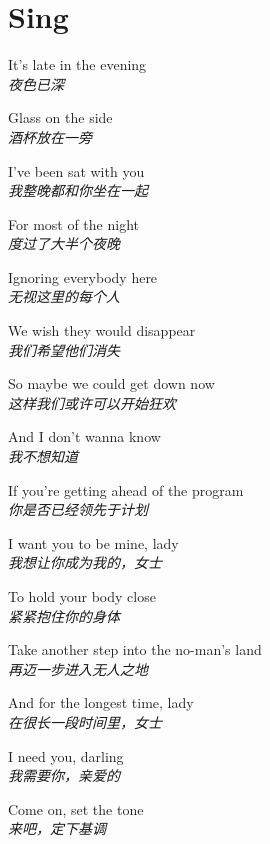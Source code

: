 \section{Sing}

\thispagestyle{empty}


\begin{spacing}{1.5}
\begin{flushleft}
It's late in the evening\\
\textit{夜色已深}\lyricspace

Glass on the side\\
\textit{酒杯放在一旁}\lyricspace

I've been sat with you\\
\textit{我整晚都和你坐在一起}\lyricspace

For most of the night\\
\textit{度过了大半个夜晚}\lyricspace

Ignoring everybody here\\
\textit{无视这里的每个人}\lyricspace

We wish they would disappear\\
\textit{我们希望他们消失}\lyricspace

So maybe we could get down now\\
\textit{这样我们或许可以开始狂欢}\lyricspace

And I don't wanna know\\
\textit{我不想知道}\lyricspace

If you're getting ahead of the program\\
\textit{你是否已经领先于计划}\lyricspace

I want you to be mine, lady\\
\textit{我想让你成为我的，女士}\lyricspace

To hold your body close\\
\textit{紧紧抱住你的身体}\lyricspace

Take another step into the no-man's land\\
\textit{再迈一步进入无人之地}\lyricspace

And for the longest time, lady\\
\textit{在很长一段时间里，女士}\lyricspace

I need you, darling\\
\textit{我需要你，亲爱的}\lyricspace

Come on, set the tone\\
\textit{来吧，定下基调}\lyricspace


\end{flushleft}
\end{spacing}
